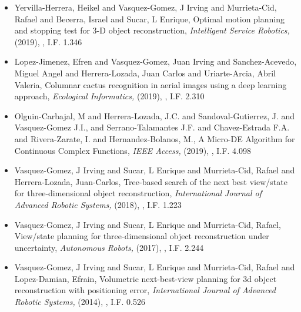 \begin{itemize}
\item Yervilla-Herrera, Heikel and Vasquez-Gomez, J Irving and Murrieta-Cid, Rafael and Becerra, Israel and Sucar, L Enrique, Optimal motion planning and stopping test for 3-D object reconstruction,\textit{ Intelligent Service Robotics,} (2019), \href{https://doi.org/10.1007/s11370-018-0264-y} {\faFilePdfO}, I.F. 1.346 
\item Lopez-Jimenez, Efren and Vasquez-Gomez, Juan Irving and Sanchez-Acevedo, Miguel Angel and Herrera-Lozada, Juan Carlos and Uriarte-Arcia, Abril Valeria, Columnar cactus recognition in aerial images using a deep learning approach,\textit{ Ecological Informatics,} (2019), \href{https://doi.org/10.1016/j.ecoinf.2019.05.005} {\faFilePdfO}, I.F. 2.310 
\item Olguin-Carbajal, M and Herrera-Lozada, J.C. and Sandoval-Gutierrez, J. and Vasquez-Gomez J.I., and Serrano-Talamantes J.F. and Chavez-Estrada F.A. and Rivera-Zarate, I. and Hernandez-Bolanos, M., A Micro-DE Algorithm for Continuous Complex Functions,\textit{ IEEE Access,} (2019), \href{https://doi.org/10.1109/ACCESS.2019.2954296} {\faFilePdfO}, I.F. 4.098 
\item Vasquez-Gomez, J Irving and Sucar, L Enrique and Murrieta-Cid, Rafael and Herrera-Lozada, Juan-Carlos, Tree-based search of the next best view/state for three-dimensional object reconstruction,\textit{ International Journal of Advanced Robotic Systems,} (2018), \href{https://journals.sagepub.com/doi/10.1177/1729881418754575} {\faFilePdfO}, I.F. 1.223 
\item Vasquez-Gomez, J Irving and Sucar, L Enrique and Murrieta-Cid, Rafael, View/state planning for three-dimensional object reconstruction under uncertainty,\textit{ Autonomous Robots,} (2017), \href{https://doi.org/10.1007/s10514-015-9531-3} {\faFilePdfO}, I.F. 2.244 
\item Vasquez-Gomez, J Irving and Sucar, L Enrique and Murrieta-Cid, Rafael and Lopez-Damian, Efrain, Volumetric next-best-view planning for 3d object reconstruction with positioning error,\textit{ International Journal of Advanced Robotic Systems,} (2014), \href{https://doi.org/10.5772%2F58759} {\faFilePdfO}, I.F. 0.526 
\end{itemize} 
